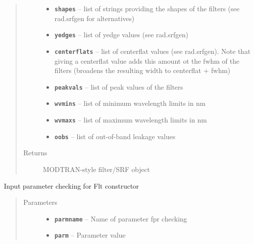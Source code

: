 \documentclass[a4paper,10pt,english]{sphinxmanual}
\begin{document}
\begin{fulllineitems}
\begin{fulllineitems}
\begin{quote}
\begin{description}
\begin{itemize}
\item {} 
\textbf{\texttt{shapes}} -- list of strings providing the shapes of the filters (see rad.srfgen for alternatives)

\item {} 
\textbf{\texttt{yedges}} -- list of yedge values (see rad.srfgen)

\item {} 
\textbf{\texttt{centerflats}} -- list of centerflat values (see rad.srfgen). Note that giving a centerflat value adds this
amount ot the fwhm of the filters (broadens the resulting width to centerflat + fwhm)

\item {} 
\textbf{\texttt{peakvals}} -- list of peak values of the filters

\item {} 
\textbf{\texttt{wvmins}} -- list of minimum wavelength limits in nm

\item {} 
\textbf{\texttt{wvmaxs}} -- list of maximum wavelength limits in nm

\item {} 
\textbf{\texttt{oobs}} -- list of out-of-band leakage values

\end{itemize}

\item[{Returns}] \leavevmode
MODTRAN-style filter/SRF object

\end{description}\end{quote}

\end{fulllineitems}


\begin{fulllineitems}
\label{packages:radute.Flt.checkparm}
Input parameter checking for Flt constructor
\begin{quote}\begin{description}
\item[{Parameters}] \leavevmode\begin{itemize}
\item {} 
\textbf{\texttt{parmname}} -- Name of parameter fpr checking

\item {} 
\textbf{\texttt{parm}} -- Parameter value


\end{itemize}
\end{description}
\end{quote}
\end{fulllineitems}
\end{fulllineitems}
\end{document}
